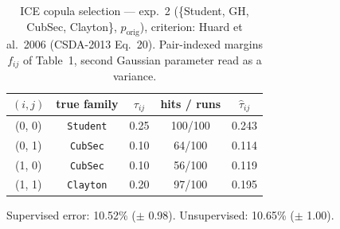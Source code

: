\begin{table}[htbp]
  \centering
  \caption{ICE copula selection — exp.\ 2 (\{Student, GH, CubSec, Clayton\}, $p_{\text{orig}}$), criterion: Huard et al.\ 2006 (CSDA-2013 Eq.\ 20). Pair-indexed margins $f_{ij}$ of Table~1, second Gaussian parameter read as a variance.}
  \label{tab:exp3-exp2_orig_p__huard}
  \begin{tabular}{ccccc}
    \toprule
    $(i, j)$ & true family & $\tau_{ij}$ & hits / runs & $\hat\tau_{ij}$ \\
    \midrule
    (0, 0) & \texttt{Student} & 0.25 & 100/100 & 0.243 \\
    (0, 1) & \texttt{CubSec} & 0.10 & 64/100 & 0.114 \\
    (1, 0) & \texttt{CubSec} & 0.10 & 56/100 & 0.119 \\
    (1, 1) & \texttt{Clayton} & 0.20 & 97/100 & 0.195 \\
    \bottomrule
  \end{tabular}
  \par\smallskip Supervised error: 10.52\% ($\pm$ 0.98). Unsupervised: 10.65\% ($\pm$ 1.00).
\end{table}
